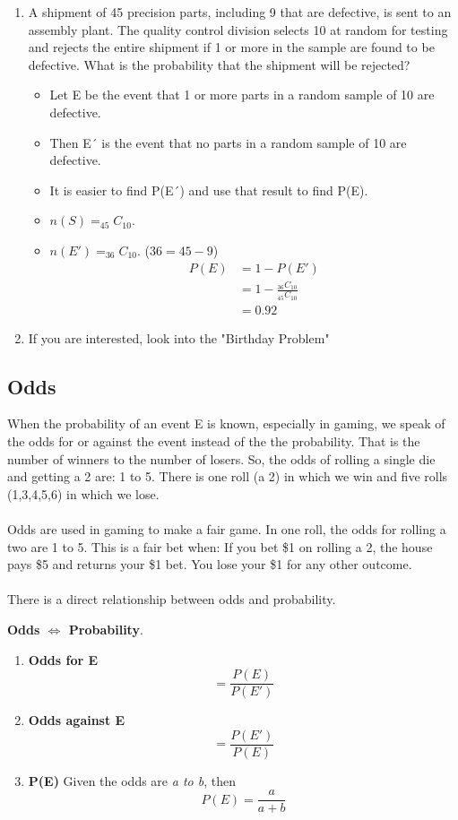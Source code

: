 \documentclass[14pt]{extarticle}
\begin{document}
\begin{enumerate}
	\item A shipment of 45 precision parts, including 9 that are defective, is sent to an assembly plant. The quality control division selects 10 at random for testing and rejects the entire shipment if 1 or more in the sample are found to be defective.
	What is the probability that the shipment will be rejected?
	\begin{itemize}
		\item Let E be the event that 1 or more parts in a random sample of 10 are defective.	
		\item Then E´ is the event that no parts in a random sample of 10 are defective.
		\item It is easier to find P(E´) and use that result to find P(E).
		\item $n(S) = _{45}C_{10}$.
		\item $n(E') = _{36}C_{10}$. ($36 = 45-9$)
		\begin{align*}
			P(E) &=1 - P(E') \\
			&= 1 - \frac{_{36}C_{10}}{_{45}C_{10}} \\
			& = 0.92
		\end{align*}
	\end{itemize}

	\item If you are interested, look into the "Birthday Problem"
\end{enumerate}

\subsection{Odds}
When the probability of an event E is known, especially in gaming, we speak of the odds for or against the event instead of the the probability. That is the number of winners to the number of losers. So, the odds of rolling a single die and getting a 2 are: 1 to 5. There is one roll (a 2) in which we win and five rolls (1,3,4,5,6) in which we lose.
\\\\
Odds are used in gaming to make a fair game. In one roll, the odds for rolling a two are 1 to 5. This is a fair bet when: If you bet \$1 on rolling a 2, the house pays \$5 and returns your \$1 bet. You lose your \$1 for any other outcome. 
\\\\
There is a direct relationship between odds and probability.
\begin{tcolorbox}[enhanced jigsaw,colback=bg,boxrule=0pt,arc=0pt] 
	\textbf{Odds $\Leftrightarrow $ Probability}.
	\begin{enumerate}
		\item \textbf{Odds for E} $$= \frac{P(E)}{P(E')}$$
		\item \textbf{Odds against E} $$= \frac{P(E')}{P(E)}$$
		\item \textbf{P(E)} Given the odds are \textit{a to b}, then $$P(E)= \frac{a}{a+b}$$
	\end{enumerate}
\end{tcolorbox}
\end{document}
